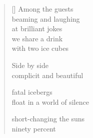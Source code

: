 \documentclass[12pt,a4paper]{article}
\begin{document}
\thispagestyle{empty}

\poemtitle{}

\settowidth{\versewidth}{float in a world of silence}

\bigskip

\begin{verse}[\versewidth]
  Among the guests \\
  beaming and laughing \\
  at brilliant jokes \\
  we share a drink \\
  with two ice cubes

  Side by side \\
  complicit and beautiful

  fatal icebergs \\
  float in a world of silence

  short-changing the suns \\
  ninety percent
\end{verse}
\end{document}
